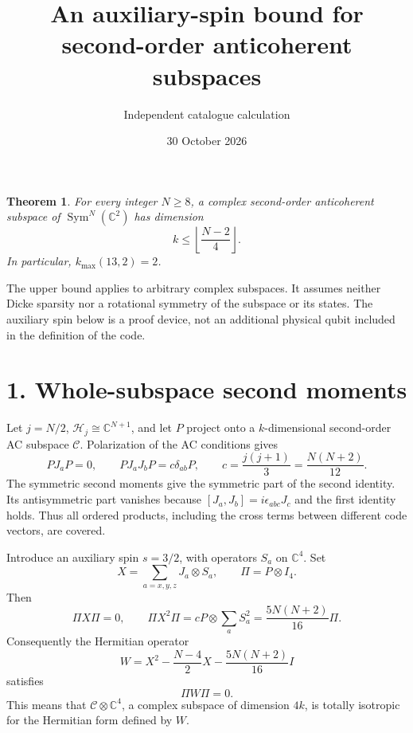 \documentclass[11pt]{article}
\newtheorem{theorem}{Theorem}
\begin{document}
\title{An auxiliary-spin bound for second-order anticoherent subspaces}
\author{Independent catalogue calculation}
\date{30 October 2026}
\maketitle
\begin{theorem}
For every integer $N\ge8$, a complex second-order anticoherent subspace
of $\operatorname{Sym}^N(\mathbb C^2)$ has dimension
\[
 \boxed{\quad k\le\left\lfloor\frac{N-2}{4}\right\rfloor.\quad}
\]
In particular, $k_{\max}(13,2)=2$.
\end{theorem}
The upper bound applies to arbitrary complex subspaces. It assumes neither
Dicke sparsity nor a rotational symmetry of the subspace or its states.
The auxiliary spin below is a proof device, not an additional physical
qubit included in the definition of the code.

\section*{1. Whole-subspace second moments}
Let $j=N/2$, $\mathcal H_j\cong\mathbb C^{N+1}$, and let $P$ project
onto a $k$-dimensional second-order AC subspace $\mathcal C$. Polarization
of the AC conditions gives
\[
 PJ_aP=0,\qquad PJ_aJ_bP=c\delta_{ab}P,\qquad
 c=\frac{j(j+1)}3=\frac{N(N+2)}{12}.
\]
The symmetric second moments give the symmetric part of the second
identity. Its antisymmetric part vanishes because
$[J_a,J_b]=i\epsilon_{abc}J_c$ and the first identity holds. Thus all
ordered products, including the cross terms between different code
vectors, are covered.

Introduce an auxiliary spin $s=3/2$, with operators $S_a$ on
$\mathbb C^4$. Set
\[
 X=\sum_{a=x,y,z}J_a\otimes S_a,
 \qquad \Pi=P\otimes I_4.
\]
Then
\[
 \Pi X\Pi=0,\qquad
 \Pi X^2\Pi=cP\otimes\sum_aS_a^2
 =\frac{5N(N+2)}{16}\Pi.
\]
Consequently the Hermitian operator
\[
 \boxed{W=X^2-\frac{N-4}{2}X-\frac{5N(N+2)}{16}I}
\]
satisfies
\[
 \Pi W\Pi=0.
\]
This means that $\mathcal C\otimes\mathbb C^4$, a complex subspace of
dimension $4k$, is totally isotropic for the Hermitian form defined by $W$.
\end{document}
